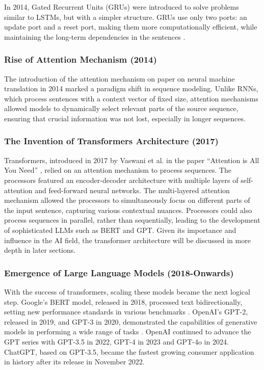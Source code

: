 In 2014, Gated Recurrent Units (GRUs) were introduced to solve problems similar to LSTMs, but with a simpler structure. GRUs use only two ports: an update port and a reset port, making them more computationally efficient, while maintaining the long-term dependencies in the sentences \cite{cho2014learning}.

\subsubsection{Rise of Attention Mechanism (2014)}

The introduction of the attention mechanism on paper on neural machine translation \cite{bahdanau2014neural} in 2014 marked a paradigm shift in sequence modeling. Unlike RNNs, which process sentences with a context vector of fixed size, attention mechanisms allowed models to dynamically select relevant parts of the source sequence, ensuring that crucial information was not lost, especially in longer sequences.

\subsubsection{The Invention of Transformers Architecture (2017)}

Transformers, introduced in 2017 by Vaswani et al. in the paper “Attention is All You Need” \cite{vaswani2017attention}, relied on an attention mechanism to process sequences. The processors featured an encoder-decoder architecture with multiple layers of self-attention and feed-forward neural networks. The multi-layered attention mechanism allowed the processors to simultaneously focus on different parts of the input sentence, capturing various contextual nuances. Processors could also process sequences in parallel, rather than sequentially, leading to the development of sophisticated LLMs such as BERT and GPT. Given its importance and influence in the AI field, the transformer architecture will be discussed in more depth in later sections.

\subsubsection{Emergence of Large Language Models (2018-Onwards)}

With the success of transformers, scaling these models became the next logical step. Google's BERT model, released in 2018, processed text bidirectionally, setting new performance standards in various benchmarks \cite{devlin2018bert}. OpenAI's GPT-2, released in 2019, and GPT-3 in 2020, demonstrated the capabilities of generative models in performing a wide range of tasks \cite{radford2019language}. OpenAI continued to advance the GPT series with GPT-3.5 in 2022, GPT-4 in 2023 and GPT-4o in 2024. ChatGPT, based on GPT-3.5, became the fastest growing consumer application in history after its release in November 2022.

